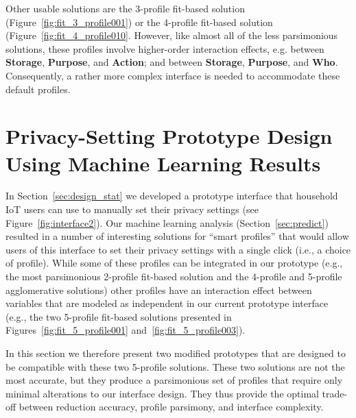 Other usable solutions are the 3-profile fit-based solution (Figure~\ref{fig:fit_3_profile001}) or the 4-profile fit-based solution (Figure~\ref{fig:fit_4_profile010}. However, like almost all of the less parsimonious solutions, these profiles involve higher-order interaction effects, e.g. between \textbf{Storage}, \textbf{Purpose}, and \textbf{Action}; and between \textbf{Storage}, \textbf{Purpose}, and \textbf{Who}. Consequently, a rather more complex interface is needed to accommodate these default profiles.

\section{Privacy-Setting Prototype Design Using Machine Learning Results}\label{sec:design_ml}
In Section~\ref{sec:design_stat} we developed a prototype interface that household IoT users can use to manually set their privacy settings (see Figure~\ref{fig:interface2}). Our machine learning analysis (Section~\ref{sec:predict}) resulted in a number of interesting solutions for ``smart profiles'' that would allow users of this interface to set their privacy settings with a single click (i.e., a choice of profile). While some of these profiles can be integrated in our prototype (e.g., the most parsimonious 2-profile fit-based solution and the 4-profile and 5-profile agglomerative solutions) other profiles have an interaction effect between variables that are modeled as independent in our current prototype interface (e.g., the two 5-profile fit-based solutions presented in Figures~\ref{fig:fit_5_profile001} and~\ref{fig:fit_5_profile003}).

In this section we therefore present two modified prototypes that are designed to be compatible with these two 5-profile solutions. These two solutions are not the most accurate, but they produce a parsimonious set of profiles that require only minimal alterations to our interface design. They thus provide the optimal trade-off between reduction accuracy, profile parsimony, and interface complexity.

